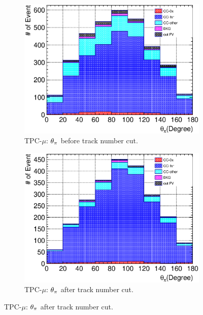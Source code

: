\begin{figure}[ht]
\begin{subfigure}{\dbfigwid\textwidth}
             \end{subfigure}
             \\
             \begin{subfigure}{\dbfigwid\textwidth}
                  \includegraphics[width=\textwidth]{figures/sel/TPCmu_theta_pi_stack_al8.eps}
                  \caption{TPC-$\mu$: $\theta_{\pi}$ before track number cut.}
                  \label{subfig:tlpi-tpi-bf-trknumcut-tpc}
             \end{subfigure}
             \begin{subfigure}{\dbfigwid\textwidth}
                  \includegraphics[width=\textwidth]{figures/sel/TPCmu_theta_pi_stack_al9.eps}
                  \caption{TPC-$\mu$: $\theta_{\pi}$ after track number cut.}

\end{subfigure}
\end{figure}
